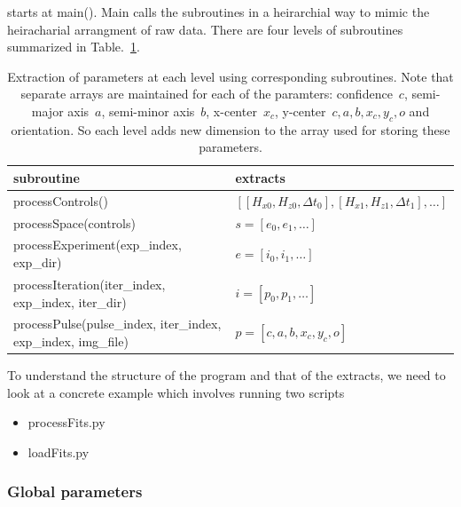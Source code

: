 \documentclass[12pt, twoside, a4paper]{article}
\begin{document}
starts at main(). Main calls the subroutines in a heirarchial way to mimic the heiracharial arrangment of raw data. There are four levels of subroutines summarized in Table.~\ref{table: structure of program}. 
%
\begin{table}[!htbp]
	\centering
	\begin{tabular}{ll}
		\hline\hline
		subroutine	&	 extracts	 \\
		\hline
		processControls()		&	$[[H_{x0}, H_{z0}, \Delta t_{0}], [H_{x1}, H_{z1}, \Delta t_{1}], \ldots]$	\\
		processSpace(controls)	& 	$s = [e_{0}, e_{1}, \ldots]$ 	\\
		processExperiment(exp\_index, exp\_dir)		&	$e = [i_{0}, i_{1}, \ldots]$			\\
		processIteration(iter\_index, exp\_index, iter\_dir)	&	$i = [p_{0}, p_{1}, \ldots]$				\\
		processPulse(pulse\_index, iter\_index, exp\_index, img\_file)	&	$p = [c, a, b, x_{c}, y_{c}, o]$			\\
		\hline\hline
	\end{tabular}
	\caption{Extraction of parameters at each level using corresponding subroutines. Note that separate arrays are maintained for each of the paramters: confidence~$c$, semi-major axis~$a$, semi-minor axis~$b$, x-center~$x_{c}$, y-center~$c, a, b, x_{c}, y_{c}, o$ and orientation. So each level adds new dimension to the array used for storing these parameters.}
	\label{table: structure of program}
\end{table}
%
To understand the structure of the program and that of the extracts, we need to look at a concrete example which involves running two scripts
\begin{itemize}
	\item processFits.py
	\item loadFits.py
\end{itemize}

\subsubsection{Global parameters}
\end{document}
